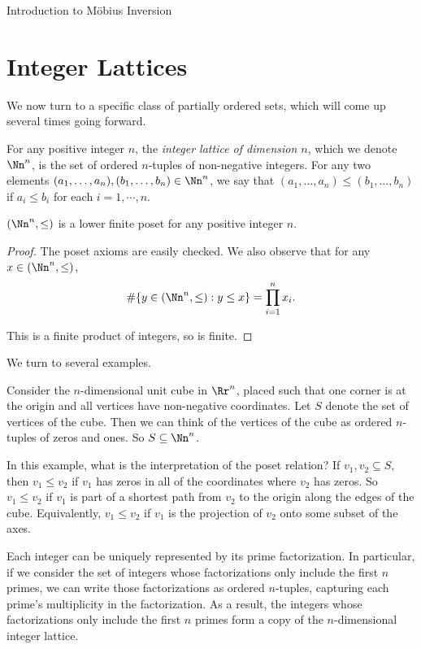 \documentclass[12pt]{pom_thesis}
\begin{document}
\begin{chapter}{Introduction to M\"obius Inversion}
\section{Integer Lattices}
We now turn to a specific class of partially ordered sets, which will come up several times going forward.
\begin{defn}\label{lattice}
For any positive integer $n$, the \emph{integer lattice of dimension $n$}, which we denote $\Nn^n$, is the set of ordered $n$-tuples of non-negative integers. For any two elements $(a_1,\dots,a_n), (b_1,\dots,b_n) \in \Nn^n$, we say that $(a_1,\dots,a_n)\leq (b_1,\dots,b_n)$ if $a_i \leq b_i$ for each $i = 1,\cdots,n$.
\end{defn}
\begin{lemma}
$(\Nn^n, \leq)$ is a lower finite poset for any positive integer $n$. 
\end{lemma}
\begin{proof}
The poset axioms are easily checked. We also observe that for any $x \in (\Nn^n, \leq)$,
\[
\#\{y \in (\Nn^n, \leq):y \leq x\} = \prod_{i =1}^n x_i.
\]

This is a finite product of integers, so is finite.
\end{proof}

We turn to several examples.
\begin{examp}
Consider the $n$-dimensional unit cube in $\Rr^n$, placed such that one corner is at the origin and all vertices have non-negative coordinates. Let $S$ denote the set of vertices of the cube. Then we can think of the vertices of the cube as ordered $n$-tuples of zeros and ones. So $S \subseteq \Nn^{n}$. 

In this example, what is the interpretation of the poset relation? If $v_1, v_2 \subseteq S$, then $v_1 \leq v_2$ if $v_1$ has zeros in all of the coordinates where $v_2$ has zeros. So $v_1 \leq v_2$ if $v_1$ is part of a shortest path from $v_2$ to the origin along the edges of the cube. Equivalently, $v_1 \leq v_2$ if $v_1$ is the projection of $v_2$ onto some subset of the axes. %
\end{examp}
\begin{examp}
Each integer can be uniquely represented by its prime factorization. In particular, if we consider the set of integers whose factorizations only include the first $n$ primes, we can write those factorizations as ordered $n$-tuples, capturing each prime's multiplicity in the factorization. As a result, the integers whose factorizations only include the first $n$ primes form a copy of the $n$-dimensional integer lattice. 


\end{examp}
\end{chapter}
\end{document}
